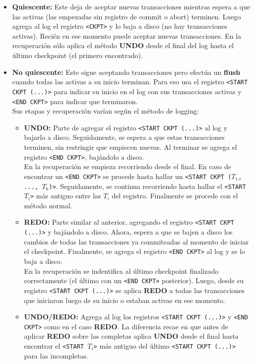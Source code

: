 \begin{itemize}
    \item \textbf{Quiescente:} Este deja de aceptar nuevas transacciones mientras espera a que las activas (las empezadas sin registro de commit o abort) terminen. Luego agrega al log el registro \texttt{<CKPT>} y lo baja a disco (no hay transacciones activas). Recién en ese momento puede aceptar nuevas transacciones. En la recuperación sólo aplica el método \textbf{UNDO} desde el final del log hasta el último checkpoint (el primero encontrado).
    \item \textbf{No quiescente:} Este sigue aceptando transacciones pero efectúa un \textbf{flush} cuando todas las activas a su inicio terminan. Para eso usa el registro \texttt{<START CKPT (...)>} para indicar su inicio en el log con sus transacciones activas y \texttt{<END CKPT>} para indicar que terminaron. \\
    Sus etapas y recuperación varían según el método de logging:
    \begin{itemize}
        \item \textbf{UNDO:} Parte de agregar el registro \texttt{<START CKPT (...)>} al log y bajarlo a disco. Seguidamente, se espera a que estas transacciones terminen, sin restringir que empiecen nuevas. Al terminar se agrega el registro \texttt{<END CKPT>}, bajándolo a disco. \\
        En la recuperación se empieza recorriendo desde el final. En caso de encontrar un \texttt{<END CKPT>} se procede hasta hallar un \texttt{<START CKPT ($T_1$, ..., $T_k$)>}. Seguidamente, se continua recorriendo hasta hallar el \texttt{<START $T_i$>} más antiguo entre las $T_i$ del registro. Finalmente se procede con el método normal.
        \item \textbf{REDO:} Parte similar al anterior, agregando el registro \texttt{<START CKPT (...)>} y bajándolo a disco. Ahora, espera a que se bajen a disco los cambios de todas las transacciones ya commiteadas al momento de iniciar el checkpoint. Finalmente, se agrega el registro \texttt{<END CKPT>} al log y se lo baja a disco. \\
        En la recuperación se indentifica al último checkpoint finalizado correctamente (el último con un \texttt{<END CKPT>} posterior). Luego, desde su registro \texttt{<START CKPT (...)>} se aplica \textbf{REDO} a todas las transacciones que iniciaron luego de su inicio o estaban activas en ese momento.
        \item \textbf{UNDO/REDO:} Agrega al log los registros \texttt{<START CKPT (...)>} y \texttt{<END CKPT>} como en el caso \textbf{REDO}. La diferencia recae en que antes de aplicar \textbf{REDO} sobre las completas aplica \textbf{UNDO} desde el final hasta encontrar el \texttt{<START $T_i$>} más antiguo del último \texttt{<START CKPT (...)>} para las incompletas.
    \end{itemize}
\end{itemize}